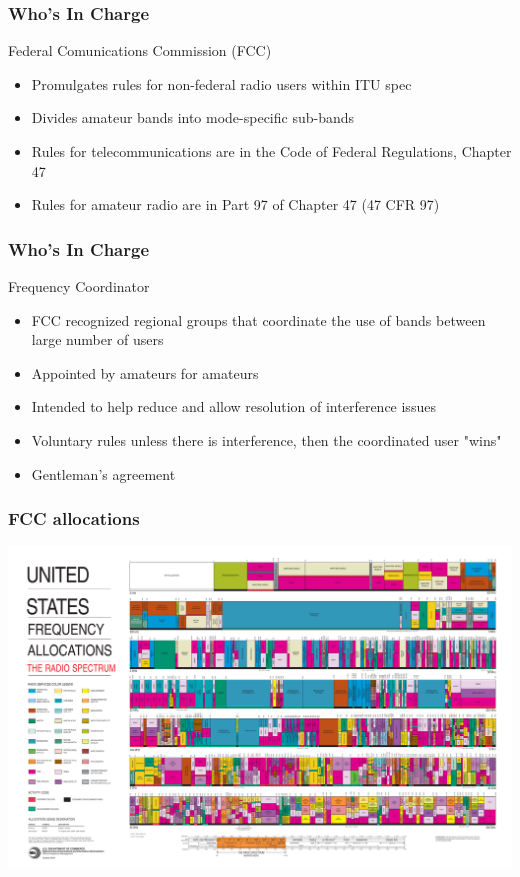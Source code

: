 \documentclass[10pt]{beamer}
\begin{document}
\begin{frame}
\frametitle{Who's In Charge}
Federal Comunications Commission (FCC)
\begin{itemize}
\item Promulgates  rules for non-federal radio users within ITU spec
\item Divides amateur bands into mode-specific sub-bands
\item Rules for telecommunications are in the Code of Federal Regulations, Chapter 47
\item Rules for amateur radio are in Part 97 of Chapter 47 (47 CFR 97)
\end{itemize}
\end{frame}

\begin{frame}
\frametitle{Who's In Charge}
Frequency Coordinator
\begin{itemize}
\item FCC recognized regional groups that coordinate the use of bands between large number of users \pause
\item Appointed by amateurs for amateurs \pause
\item Intended to help reduce and allow resolution of interference issues \pause
\item Voluntary rules unless there is interference, then the coordinated user "wins"\pause
\item Gentleman's agreement
\end{itemize}
\end{frame}

\begin{frame}
\frametitle{FCC allocations}
\begin{center}
\includegraphics[width=\textwidth]{2003-allochrt.pdf}
\end{center}
\end{frame}
\end{document}
